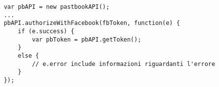 \begin{lstlisting}
	var pbAPI = new pastbookAPI();
	...
	pbAPI.authorizeWithFacebook(fbToken, function(e) {
		if (e.success) {
			var pbToken = pbAPI.getToken();
		}
		else {
			// e.error include informazioni riguardanti l'errore
		}
	});
\end{lstlisting}
